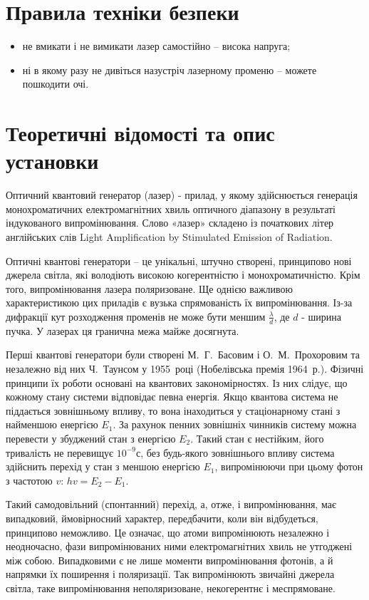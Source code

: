 \documentclass[twocolumn]{el-author}
\begin{document}
\section{Правила техніки безпеки}

\begin{itemize}
	\item  не вмикати і не вимикати лазер самостійно -- висока
напруга;
	\item  ні в якому разу не дивіться назустріч лазерному променю --
можете пошкодити очі.
\end{itemize}

\section{Теоретичні відомості та опис установки}

Оптичний квантовий генератор (лазер) - прилад, у якому здійснюється
генерація монохроматичних електромагнітних хвиль оптичного діапазону в
результаті індукованого випромінювання. Слово «лазер» складено із
початкових літер англійських слів Light Amplification by Stimulated Emission of Radiation.

Оптичні квантові генератори -- це унікальні, штучно створені,
принципово нові джерела світла, які володіють високою когерентністю і
монохроматичністю. Крім того, випромінювання лазера поляризоване. Ще
однією важливою характеристикою цих приладів є вузька спрямованість їх
випромінювання. Із-за дифракції кут розходження променів не може бути
меншим $\frac{\lambda}{d}$, де $d$ - ширина пучка. 
У лазерах ця гранична межа майже досягнута.

Перші квантові генератори були створені М.~Г.~Басовим і О.~М.~Прохоровим 
та незалежно від них Ч.~Таунсом у 1955~році (Нобелівська
премія 1964~р.). Фізичні принципи їх роботи основані на квантових
закономірностях. Із них слідує, що кожному стану системи відповідає певна
енергія. Якщо квантова система не піддається зовнішньому впливу, то вона
інаходиться у стаціонарному стані з найменшою енергією $E_{1}$. За рахунок
пенних зовнішніх чинників систему можна перевести у збуджений стан з
енергією $E_{2}$. Такий стан є нестійким, його тривалість не перевищує $10^{-9}$с, 
без будь-якого зовнішнього впливу система здійснить перехід у стан з меншою
енергією $E_{1}$, випромінюючи при цьому фотон з частотою $v$: $hv = E_{2} - E_{1}$.

Такий самодовільний (спонтанний) перехід, а, отже, і випромінювання,
має випадковий, ймовірносний характер, передбачити, коли він відбудеться,
принципово неможливо. Це означає, що атоми випромінюють незалежно і
неодночасно, фази випромінюваних ними електромагнітних хвиль не
утгоджені між собою. Випадковими є не лише моменти випромінювання
фотонів, а й напрямки їх поширення і поляризації. Так випромінюють
звичайні джерела світла, таке випромінювання неполяризоване, некогерентнє
і меспрямоване.
\end{document}
